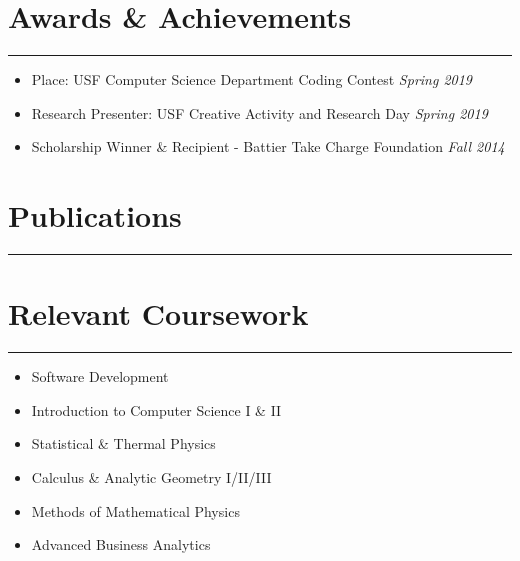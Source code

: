 \documentclass[11pt,a4paper]{article}
\newenvironment{myitemize}
{ \begin{itemize}[label={--}, leftmargin=*]
    \setlength{\itemsep}{0pt}
    \setlength{\parskip}{0pt}
    \setlength{\parsep}{0pt}     }
{ \end{itemize}                  }
\begin{document}
\section*{Awards \& Achievements}
\vspace{-3mm} %
\hrule
\vspace{3mm} %

\begin{myitemize}
\item {} Place: USF Computer Science Department Coding Contest \hfill{\textit{Spring 2019} }
\item Research Presenter: USF Creative Activity and Research Day \hfill{\textit{Spring 2019} }
\item Scholarship Winner \& Recipient - Battier Take Charge Foundation \hfill{\textit{Fall 2014}}
\end{myitemize}

\section*{Publications}
\vspace{-3mm} %

\hrule
\vspace{3mm} %



\section*{Relevant Coursework}
\vspace{-3mm} %
\hrule

\begin{multicols}{2}
\begin{itemize}[noitemsep] %
    \item Software Development
    \item Introduction to Computer Science I \& II
    \item Statistical \& Thermal Physics
    \item Calculus \& Analytic Geometry I/II/III
    \item Methods of Mathematical Physics
    \item Advanced Business Analytics
\end{itemize}

\end{multicols}
\end{document}
